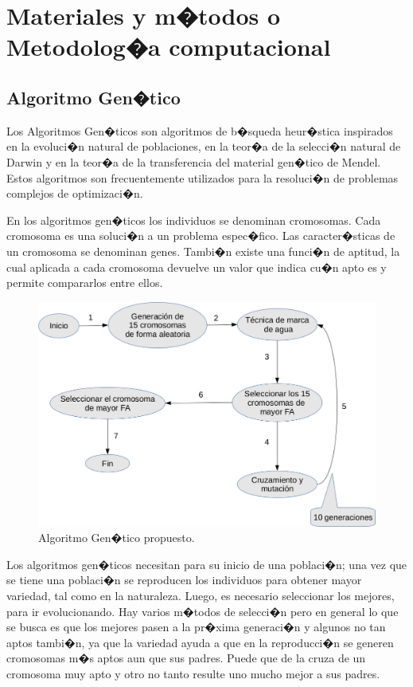 \documentclass{rcci} %
\begin{document}
\section{Materiales y m�todos o Metodolog�a computacional}\label{metodos}

\subsection{Algoritmo Gen�tico}

Los Algoritmos Gen�ticos son algoritmos de b�squeda heur�stica inspirados en la evoluci�n natural de poblaciones,
en la teor�a de la selecci�n natural de Darwin y en la teor�a de la transferencia del material gen�tico de Mendel. Estos algoritmos son frecuentemente
utilizados para la resoluci�n de problemas complejos de optimizaci�n. \parencite{Michalewicz2002}

En los algoritmos gen�ticos los individuos se denominan cromosomas. Cada cromosoma
es una soluci�n a un problema espec�fico. Las caracter�sticas de un cromosoma se
denominan genes. Tambi�n existe una funci�n de aptitud, la cual aplicada a cada
cromosoma devuelve un valor que indica cu�n apto es y permite compararlos entre ellos.

\begin{figure}[h]	%
\centering
\includegraphics[width=12cm]{AG} %
\caption{Algoritmo Gen�tico propuesto.}
\label{ag}
\end{figure}

Los algoritmos gen�ticos necesitan para su inicio de una poblaci�n; una vez que se tiene una
poblaci�n se reproducen los individuos para obtener mayor variedad, tal como en la
naturaleza. Luego, es necesario seleccionar los mejores, para ir evolucionando. Hay varios
m�todos de selecci�n pero en general lo que se busca es que los mejores pasen a la
pr�xima generaci�n y algunos no tan aptos tambi�n, ya que la variedad ayuda a que en la
reproducci�n se generen cromosomas m�s aptos aun que sus padres. Puede que de la
cruza de un cromosoma muy apto y otro no tanto resulte uno mucho mejor a sus padres.
\end{document}
